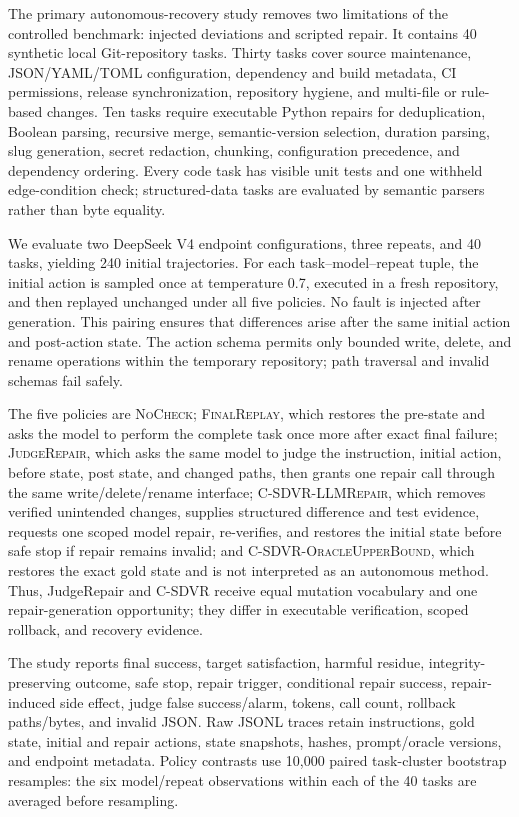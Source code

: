 \documentclass[pdflatex,sn-apa]{sn-jnl}
\begin{document}
The primary autonomous-recovery study removes two limitations of the controlled benchmark: injected deviations and scripted repair. It contains 40 synthetic local Git-repository tasks. Thirty tasks cover source maintenance, JSON/YAML/TOML configuration, dependency and build metadata, CI permissions, release synchronization, repository hygiene, and multi-file or rule-based changes. Ten tasks require executable Python repairs for deduplication, Boolean parsing, recursive merge, semantic-version selection, duration parsing, slug generation, secret redaction, chunking, configuration precedence, and dependency ordering. Every code task has visible unit tests and one withheld edge-condition check; structured-data tasks are evaluated by semantic parsers rather than byte equality.

We evaluate two DeepSeek V4 endpoint configurations, three repeats, and 40 tasks, yielding 240 initial trajectories. For each task--model--repeat tuple, the initial action is sampled once at temperature 0.7, executed in a fresh repository, and then replayed unchanged under all five policies. No fault is injected after generation. This pairing ensures that differences arise after the same initial action and post-action state. The action schema permits only bounded write, delete, and rename operations within the temporary repository; path traversal and invalid schemas fail safely.

The five policies are \textsc{NoCheck}; \textsc{FinalReplay}, which restores the pre-state and asks the model to perform the complete task once more after exact final failure; \textsc{JudgeRepair}, which asks the same model to judge the instruction, initial action, before state, post state, and changed paths, then grants one repair call through the same write/delete/rename interface; \textsc{C-SDVR-LLMRepair}, which removes verified unintended changes, supplies structured difference and test evidence, requests one scoped model repair, re-verifies, and restores the initial state before safe stop if repair remains invalid; and \textsc{C-SDVR-OracleUpperBound}, which restores the exact gold state and is not interpreted as an autonomous method. Thus, JudgeRepair and C-SDVR receive equal mutation vocabulary and one repair-generation opportunity; they differ in executable verification, scoped rollback, and recovery evidence.

The study reports final success, target satisfaction, harmful residue, integrity-preserving outcome, safe stop, repair trigger, conditional repair success, repair-induced side effect, judge false success/alarm, tokens, call count, rollback paths/bytes, and invalid JSON. Raw JSONL traces retain instructions, gold state, initial and repair actions, state snapshots, hashes, prompt/oracle versions, and endpoint metadata. Policy contrasts use 10,000 paired task-cluster bootstrap resamples: the six model/repeat observations within each of the 40 tasks are averaged before resampling.
\end{document}
